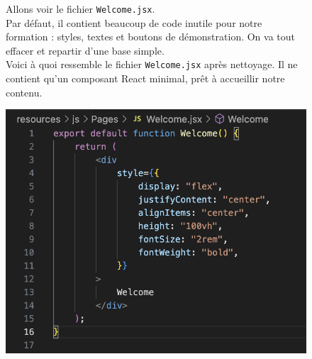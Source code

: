 \begin{figure}[H]
  \centering
  \begin{minipage}[t]{0.50\textwidth}
    \vspace{0pt}\raggedright
    Allons voir le fichier \verb|Welcome.jsx|. \\
    Par défaut, il contient beaucoup de code inutile pour notre formation : styles, textes et boutons de démonstration.  
    On va tout effacer et repartir d’une base simple.\\
    Voici à quoi ressemble le fichier \verb|Welcome.jsx| après nettoyage.
    Il ne contient qu’un composant React minimal, prêt à accueillir notre contenu.
  \end{minipage}\hfill
  \begin{minipage}[t]{0.40\textwidth} %
    \vspace{0pt}\centering
    \includegraphics[width=0.9\linewidth]{figures-C1/welcome_jsx_empty.png} %
  \end{minipage}
\end{figure}


